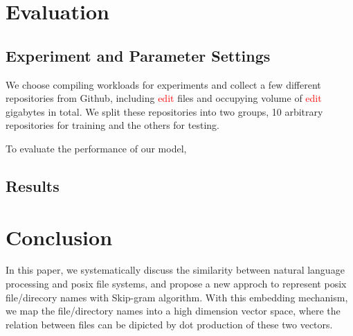 \documentclass[conference]{IEEEtran}
\begin{document}
\section{Evaluation}
\subsection{Experiment and Parameter Settings}
We choose compiling workloads for experiments and collect a few different repositories from Github,
including \textcolor{red}{edit} files and occupying volume of \textcolor{red}{edit} gigabytes in total.
We split these repositories into two groups, 10 arbitrary repositories for training and the others for testing. 

To evaluate the performance of our model, 


\subsection{Results}






\section{Conclusion}
In this paper, we systematically discuss the similarity between natural language processing and posix file systems,
and propose a new approch to represent posix file/direcory names with Skip-gram algorithm. 
With this embedding mechanism, we map the file/directory names into a high dimension vector space, 
where the relation between files can be dipicted by dot production of these two vectors.  
\end{document}
